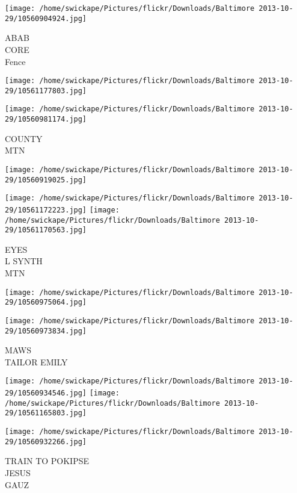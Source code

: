 \documentclass[10pt,letterpaper]{article}
\begin{document}
\vspace{0.25in}
\texttt{[image: /home/swickape/Pictures/flickr/Downloads/Baltimore 2013-10-29/10560904924.jpg]}

ABAB\\
CORE\\
Fence\\
\pagebreak

\texttt{[image: /home/swickape/Pictures/flickr/Downloads/Baltimore 2013-10-29/10561177803.jpg]}

\vspace{0.25in}
\texttt{[image: /home/swickape/Pictures/flickr/Downloads/Baltimore 2013-10-29/10560981174.jpg]}

COUNTY\\
MTN\\
\pagebreak

\texttt{[image: /home/swickape/Pictures/flickr/Downloads/Baltimore 2013-10-29/10560919025.jpg]}

\vspace{0.25in}
\texttt{[image: /home/swickape/Pictures/flickr/Downloads/Baltimore 2013-10-29/10561172223.jpg]}
\texttt{[image: /home/swickape/Pictures/flickr/Downloads/Baltimore 2013-10-29/10561170563.jpg]}

EYES\\
L SYNTH\\
MTN\\
\pagebreak

\texttt{[image: /home/swickape/Pictures/flickr/Downloads/Baltimore 2013-10-29/10560975064.jpg]}

\vspace{0.25in}
\texttt{[image: /home/swickape/Pictures/flickr/Downloads/Baltimore 2013-10-29/10560973834.jpg]}

MAWS\\
TAILOR EMILY\\
\pagebreak

\texttt{[image: /home/swickape/Pictures/flickr/Downloads/Baltimore 2013-10-29/10560934546.jpg]}
\texttt{[image: /home/swickape/Pictures/flickr/Downloads/Baltimore 2013-10-29/10561165803.jpg]}

\texttt{[image: /home/swickape/Pictures/flickr/Downloads/Baltimore 2013-10-29/10560932266.jpg]}

TRAIN TO POKIPSE\\
JESUS\\
GAUZ\\
\pagebreak
\end{document}

